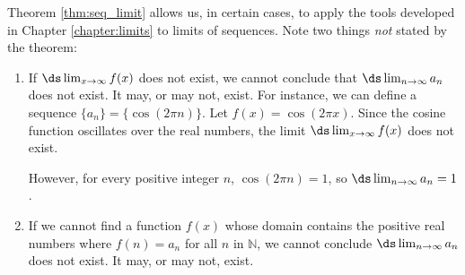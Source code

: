 Theorem \ref{thm:seq_limit} allows us, in certain cases, to apply the tools developed in Chapter \ref{chapter:limits} to limits of sequences. Note two things \textit{not} stated by the theorem:
	\begin{enumerate}
		\item If $\ds \lim_{x\to\infty}f(x)$ does not exist, we cannot conclude that $\ds\lim_{n\to\infty} a_n$ does not exist. It may, or may not, exist. For instance, we can define a sequence $\{a_n\} = \{\cos(2\pi n)\}$. Let $f(x) = \cos (2\pi x)$. Since the cosine function oscillates over the real numbers, the limit $\ds \lim_{x\to\infty}f(x)$ does not exist. 
		
		However, for every positive integer $n$, $\cos(2\pi n) = 1$, so $\ds \lim_{n\to\infty} a_n = 1$.
		
		\item	If we cannot find a function $f(x)$ whose domain contains the positive real numbers where $f(n) = a_n$ for all $n$ in $\mathbb{N}$, we cannot conclude $\ds\lim_{n\to\infty} a_n$ does not exist. It may, or may not, exist.
	\end{enumerate}




